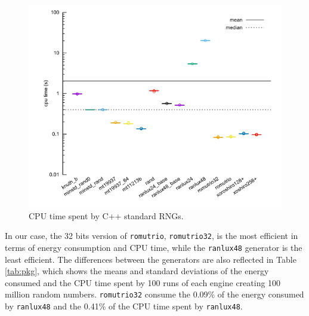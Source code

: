\documentclass[dvipsnames,format=sigconf,anonymous=true,review=true]{acmart}
\begin{document}
\begin{figure}
\centering
\includegraphics[width=\columnwidth]{cpu.png}
\caption{CPU time spent by C++ standard RNGs.}
\label{fig:cpu}
\end{figure}


In our case, the 32 bits version of \texttt{romutrio}, \texttt{romutrio32}, is the most efficient in terms of energy consumption and CPU time, while the \texttt{ranlux48} generator is the least efficient. The differences between the generators are also reflected in Table \ref{tab:pkg}, which shows the means and standard deviations of the energy consumed and the CPU time spent by 100 runs of each engine creating 100 million random numbers. \texttt{romutrio32} consume the 0.09\% of the energy consumed by \texttt{ranlux48} and the 0.41\% of the CPU time spent by \texttt{ranlux48}.
\end{document}

